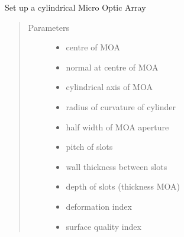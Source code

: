 \documentclass[letterpaper,10pt,english]{sphinxmanual}
\begin{document}

\begin{fulllineitems}
\label{\detokenize{xsrt_functions:xsrt.moa}}
Set up a cylindrical Micro Optic Array
\begin{quote}\begin{description}
\item[{Parameters}] \leavevmode\begin{itemize}
\item {} 
 \textendash{} centre of MOA

\item {} 
 \textendash{} normal at centre of MOA

\item {} 
 \textendash{} cylindrical axis of MOA

\item {} 
 \textendash{} radius of curvature of cylinder

\item {} 
 \textendash{} half width of MOA aperture

\item {} 
 \textendash{} pitch of slots

\item {} 
 \textendash{} wall thickness between slots

\item {} 
 \textendash{} depth of slots (thickness MOA)

\item {} 
 \textendash{} deformation index

\item {} 
 \textendash{} surface quality index

\end{itemize}

\end{description}\end{quote}

\end{fulllineitems}
\end{document}
